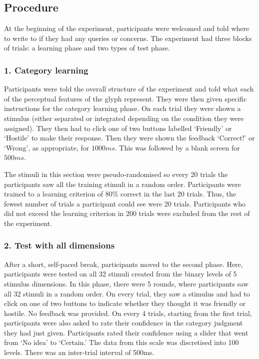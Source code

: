 \documentclass[doc, a4paper, apacite]{apa6}
\begin{document}
\subsection{Procedure}
At the beginning of the experiment, participants were welcomed and told where to write to if they had any queries or concerns. 
The experiment had three blocks of trials: a learning phase and two types of test phase. 

\subsubsection{1. Category learning} 
Participants were told the overall structure of the experiment and told what each of the perceptual features of the glyph represent. 
They were then given specific instructions for the category learning phase. 
On each trial they were shown a stimulus (either separated or integrated depending on the condition they were assigned).
They then had to click one of two buttons labelled `Friendly' or `Hostile' to make their response.
Then they were shown the feedback `Correct!' or `Wrong', as appropriate, for $1000ms$.
This was followed by a blank screen for $500ms$.

The stimuli in this section were pseudo-randomised so every 20 trials the participants saw all the training stimuli in a random order. 
Participants were trained to a learning criterion of 80\% correct in the last 20 trials. 
Thus, the fewest number of trials a participant could see were 20 trials. 
Participants who did not exceed the learning criterion in 200 trials were excluded from the rest of the experiment. 

\subsubsection{2. Test with all dimensions}
After a short, self-paced break, participants moved to the second phase. 
Here, participants were tested on all 32 stimuli created from the binary levels of 5 stimulus dimensions. 
In this phase, there were 5 rounds, where participants saw all 32 stimuli in a random order. 
On every trial, they saw a stimulus and had to click on one of two buttons to indicate whether they thought it was friendly or hostile. 
No feedback was provided. 
On every 4 trials, starting from the first trial, participants were also asked to rate their confidence in the category judgment they had just given. 
Participants rated their confidence using a slider that went from `No idea' to `Certain.'
The data from this scale was discretised into 100 levels. 
There was an inter-trial interval of 500ms. 
\end{document}
